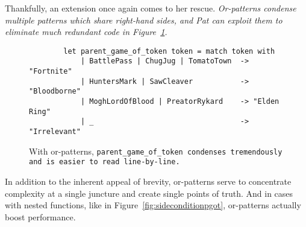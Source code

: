 \documentclass[manuscript,screen,review, 12pt]{acmart}
\begin{document}
        Thankfully, an extension once again comes to her rescue.
        \it{Or-patterns} condense multiple patterns which share right-hand
        sides, and Pat can exploit them to eliminate much redundant code in
        Figure~\ref{fig:orpgot}.

    \begin{figure}
    \begin{center}
    \begin{verbatim}
        let parent_game_of_token token = match token with 
            | BattlePass | ChugJug | TomatoTown  -> "Fortnite"
            | HuntersMark | SawCleaver           -> "Bloodborne"
            | MoghLordOfBlood | PreatorRykard    -> "Elden Ring"
            | _                                  -> "Irrelevant"
    \end{verbatim}
    \end{center}    
    \caption{With or-patterns, \tt{parent\_game\_of\_token} condenses
    tremendously and is easier to read line-by-line.} 
    \label{fig:orpgot}
    \end{figure}

    In addition to the inherent appeal of brevity, or-patterns serve to
    concentrate complexity at a single juncture and create single points of
    truth. And in cases with nested functions, like in
    Figure~\ref{fig:sideconditionpgot}, or-patterns actually boost performance.
    
    
\end{document}
